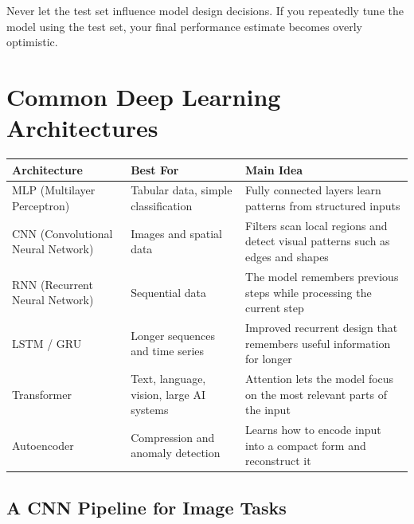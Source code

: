 \documentclass[11pt,a4paper]{article}
\begin{document}
\begin{alertbox}
Never let the test set influence model design decisions. If you repeatedly tune the model using the test set, your final performance estimate becomes overly optimistic.
\end{alertbox}

\section{Common Deep Learning Architectures}

\begin{longtable}{@{}p{3cm}p{3.2cm}p{6.3cm}@{}}
\toprule
\rowcolor{primary!15}
\textbf{Architecture} & \textbf{Best For} & \textbf{Main Idea} \\
\midrule
\endhead
MLP (Multilayer Perceptron) & Tabular data, simple classification & Fully connected layers learn patterns from structured inputs \\
\addlinespace
CNN (Convolutional Neural Network) & Images and spatial data & Filters scan local regions and detect visual patterns such as edges and shapes \\
\addlinespace
RNN (Recurrent Neural Network) & Sequential data & The model remembers previous steps while processing the current step \\
\addlinespace
LSTM / GRU & Longer sequences and time series & Improved recurrent design that remembers useful information for longer \\
\addlinespace
Transformer & Text, language, vision, large AI systems & Attention lets the model focus on the most relevant parts of the input \\
\addlinespace
Autoencoder & Compression and anomaly detection & Learns how to encode input into a compact form and reconstruct it \\
\bottomrule
\end{longtable}

\subsection{A CNN Pipeline for Image Tasks}
\end{document}
